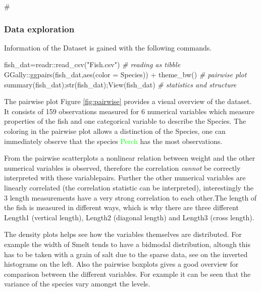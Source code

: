 \documentclass[
]{article}
\newenvironment{Shaded}{\begin{snugshade}}{\end{snugshade}}
\newcommand{\AttributeTok}[1]{\textcolor[rgb]{0.77,0.63,0.00}{#1}}
\newcommand{\CommentTok}[1]{\textcolor[rgb]{0.56,0.35,0.01}{\textit{#1}}}
\newcommand{\FunctionTok}[1]{\textcolor[rgb]{0.00,0.00,0.00}{#1}}
\newcommand{\NormalTok}[1]{#1}
\newcommand{\OtherTok}[1]{\textcolor[rgb]{0.56,0.35,0.01}{#1}}
\newcommand{\SpecialCharTok}[1]{\textcolor[rgb]{0.00,0.00,0.00}{#1}}
\newcommand{\StringTok}[1]{\textcolor[rgb]{0.31,0.60,0.02}{#1}}
\begin{document}
\newpage
\usepackage[svgnames]{xcolor}

\#

\hypertarget{data-exploration}{%
\subsubsection{Data exploration}\label{data-exploration}}

Information of the Dataset is gained with the following commands.

\begin{Shaded}
\begin{Highlighting}[]
\NormalTok{fish\_dat}\OtherTok{=}\NormalTok{readr}\SpecialCharTok{::}\FunctionTok{read\_csv}\NormalTok{(}\StringTok{"Fish.csv"}\NormalTok{)                        }\CommentTok{\#  reading as tibble}
\NormalTok{GGally}\SpecialCharTok{::}\FunctionTok{ggpairs}\NormalTok{(fish\_dat,}\FunctionTok{aes}\NormalTok{(}\AttributeTok{color =}\NormalTok{ Species)) }\SpecialCharTok{+} \FunctionTok{theme\_bw}\NormalTok{() }\CommentTok{\#  pairwise plot }
\FunctionTok{summary}\NormalTok{(fish\_dat);}\FunctionTok{str}\NormalTok{(fish\_dat);}\FunctionTok{View}\NormalTok{(fish\_dat)              }\CommentTok{\#  statistics and structure}
\end{Highlighting}
\end{Shaded}

The pairwise plot Figure \ref{fig:pairwise} provides a visual overview
of the dataset. It consists of 159 observations measured for 6 numerical
variables which measure properties of the fish and one categorical
variable to describe the Species. The coloring in the pairwise plot
allows a distinction of the Species, one can immediately observe that
the species \textcolor{lime}{Perch} has the most observations.

From the pairwise scatterplots a nonlinear relation between weight and
the other numerical variables is observed, therefore the correlation
\emph{cannot} be correctly interpreted with these variablepairs. Further
the other numerical variables are linearly correlated (the correlation
statistic can be interpreted), interestingly the 3 length measurements
have a very strong correlation to each other.The length of the fish is
measured in different ways, which is why there are three different
Length1 (vertical length), Length2 (diagonal length) and Length3 (cross
length).

The density plots helps see how the variables themselves are
distributed. For example the width of Smelt tends to have a bidmodal
distribution, altough this has to be taken with a grain of salt due to
the sparse data, see on the inverted histograms on the left. Also the
pairwise boxplots gives a good overview for comparison between the
different variables. For example it can be seen that the variance of the
species vary amongst the levels.
\end{document}
